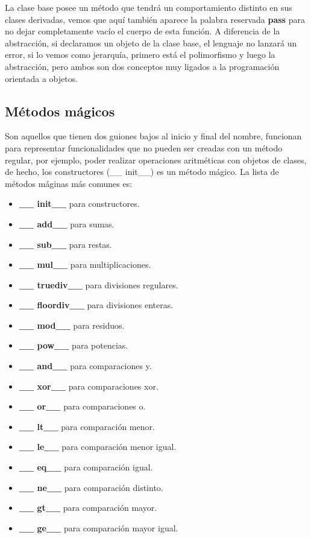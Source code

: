 La clase base posee un método que tendrá un comportamiento distinto en sus clases derivadas, vemos que aquí también aparece la palabra reservada \textbf{pass} para no dejar completamente vacío el cuerpo de esta función. A diferencia de la abstracción, si declaramos un objeto de la clase base, el lenguaje no lanzará un error, si lo vemos como jerarquía, primero está el polimorfismo y luego la abstracción, pero ambos son dos conceptos muy ligados a la programación orientada a objetos.


\subsection{Métodos mágicos}
\hspace{0.55cm}Son aquellos que tienen dos guiones bajos al inicio y final del nombre, funcionan para representar funcionalidades que no pueden ser creadas con un método regular, por ejemplo, poder realizar operaciones aritméticas con objetos de clases, de hecho, los constructores (\_\_ init\_\_) es un método mágico. La lista de métodos máginas más comunes es:
\begin{itemize}
	\item \textbf{\_\_ init\_\_} para constructores.
	\item \textbf{\_\_ add\_\_} para sumas.
	\item \textbf{\_\_ sub\_\_} para restas.
	\item \textbf{\_\_ mul\_\_} para multiplicaciones.
	\item \textbf{\_\_ truediv\_\_} para divisiones regulares.
	\item \textbf{\_\_ floordiv\_\_} para divisiones enteras.
	\item \textbf{\_\_ mod\_\_} para residuos.
	\item \textbf{\_\_ pow\_\_} para potencias.
	\item \textbf{\_\_ and\_\_} para comparaciones y.
	\item \textbf{\_\_ xor\_\_} para comparaciones xor.
	\item \textbf{\_\_ or\_\_} para comparaciones o.
	\item \textbf{\_\_ lt\_\_} para comparación menor.
	\item \textbf{\_\_ le\_\_} para comparación menor igual.
	\item \textbf{\_\_ eq\_\_} para comparación igual.
	\item \textbf{\_\_ ne\_\_} para comparación distinto.
	\item \textbf{\_\_ gt\_\_} para comparación mayor.
	\item \textbf{\_\_ ge\_\_} para comparación mayor igual.
\end{itemize}


